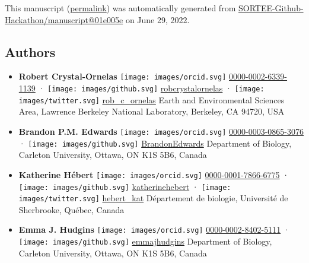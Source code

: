 This manuscript
(\href{https://SORTEE-Github-Hackathon.github.io/manuscript/v/01e005e2f013f1fa621623483512d548119fb15d/}{permalink})
was automatically generated
from \href{https://github.com/SORTEE-Github-Hackathon/manuscript/tree/01e005e2f013f1fa621623483512d548119fb15d}{SORTEE-Github-Hackathon/manuscript@01e005e}
on June 29, 2022.

\hypertarget{authors}{%
\subsection{Authors}\label{authors}}

\begin{itemize}
\item
  \textbf{Robert Crystal-Ornelas}
  \texttt{[image: images/orcid.svg]}
  \href{https://orcid.org/0000-0002-6339-1139}{0000-0002-6339-1139}
  · \texttt{[image: images/github.svg]}
  \href{https://github.com/robcrystalornelas}{robcrystalornelas}
  · \texttt{[image: images/twitter.svg]}
  \href{https://twitter.com/rob_c_ornelas}{rob\_c\_ornelas}
  Earth and Environmental Sciences Area, Lawrence Berkeley National Laboratory, Berkeley, CA 94720, USA
\item
  \textbf{Brandon P.M. Edwards}
  \texttt{[image: images/orcid.svg]}
  \href{https://orcid.org/0000-0003-0865-3076}{0000-0003-0865-3076}
  · \texttt{[image: images/github.svg]}
  \href{https://github.com/BrandonEdwards}{BrandonEdwards}
  Department of Biology, Carleton University, Ottawa, ON K1S 5B6, Canada
\item
  \textbf{Katherine Hébert}
  \texttt{[image: images/orcid.svg]}
  \href{https://orcid.org/0000-0001-7866-6775}{0000-0001-7866-6775}
  · \texttt{[image: images/github.svg]}
  \href{https://github.com/katherinehebert}{katherinehebert}
  · \texttt{[image: images/twitter.svg]}
  \href{https://twitter.com/hebert_kat}{hebert\_kat}
  Département de biologie, Université de Sherbrooke, Québec, Canada
\item
  \textbf{Emma J. Hudgins}
  \texttt{[image: images/orcid.svg]}
  \href{https://orcid.org/0000-0002-8402-5111}{0000-0002-8402-5111}
  · \texttt{[image: images/github.svg]}
  \href{https://github.com/emmajhudgins}{emmajhudgins}
  Department of Biology, Carleton University, Ottawa, ON K1S 5B6, Canada

\end{itemize}
